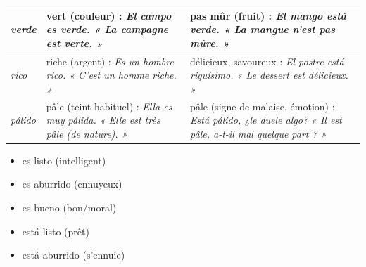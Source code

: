 \documentclass[11pt]{article}
\newcommand{\esp}[1]{\ifmmode\text{\textit{#1}}\else\begingroup\selectlanguage{spanish}\itshape #1\endgroup\fi}
\begin{document}
\begin{center}
\begin{tabularx}{\linewidth}{|l|X|X|}
\hline
\esp{verde} & vert (couleur) : \esp{El campo es verde.} « La campagne est verte. » & pas mûr (fruit) : \esp{El mango está verde.} « La mangue n'est pas mûre. » \\
\hline
\esp{rico} & riche (argent) : \esp{Es un hombre rico.} « C'est un homme riche. » & délicieux, savoureux : \esp{El postre está riquísimo.} « Le dessert est délicieux. » \\
\hline
\esp{pálido} & pâle (teint habituel) : \esp{Ella es muy pálida.} « Elle est très pâle (de nature). » & pâle (signe de malaise, émotion) : \esp{Está pálido, ¿le duele algo?} « Il est pâle, a-t-il mal quelque part ? » \\
\hline
\end{tabularx}
\end{center}

\begin{popfigure}
\begin{center}\end{center}
\vspace{-2pt}
\begin{tcbraster}[raster columns=2,raster equal height=rows,raster column skip=6pt,raster row skip=6pt,enhanced,blankest]
\begin{tcolorbox}[enhanced,colback=white,colframe=popgreenL,boxrule=0.9pt,arc=3pt,title={SER = Nature durable},fonttitle=\bfseries\scriptsize,coltitle=white,colbacktitle=popgreenL,left=4pt,right=4pt,top=2pt,bottom=2pt,boxsep=1pt,toptitle=1.5pt,bottomtitle=1.5pt,halign=left]
\begin{itemize}[nosep,leftmargin=*,itemsep=1pt,font=\scriptsize]
\item es listo (intelligent)
\item es aburrido (ennuyeux)
\item es bueno (bon/moral)
\end{itemize}
\end{tcolorbox}
\begin{tcolorbox}[enhanced,colback=white,colframe=poporangeL,boxrule=0.9pt,arc=3pt,title={ESTAR = État / Résultat},fonttitle=\bfseries\scriptsize,coltitle=white,colbacktitle=poporangeL,left=4pt,right=4pt,top=2pt,bottom=2pt,boxsep=1pt,toptitle=1.5pt,bottomtitle=1.5pt,halign=left]
\begin{itemize}[nosep,leftmargin=*,itemsep=1pt,font=\scriptsize]
\item está listo (prêt)
\item está aburrido (s'ennuie)

\end{itemize}
\end{tcolorbox}
\end{tcbraster}
\end{popfigure}
\end{document}
